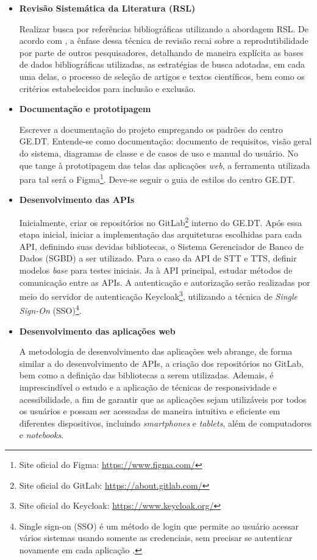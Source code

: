 \documentclass[
	12pt,				%
	a4paper,			%
	english,			%
	brazil,				%
	]{article}
\begin{document}
\begin{itemize}
	\item \textbf{Revisão Sistemática da Literatura (RSL)}
	
		Realizar busca por referências bibliográficas utilizando a abordagem RSL. De acordo com , a ênfase dessa técnica de revisão recai sobre a reprodutibilidade por parte de outros pesquisadores, detalhando de maneira explícita as bases de dados bibliográficas utilizadas, as estratégias de busca adotadas, em cada uma delas, o processo de seleção de artigos e textos científicos, bem como os critérios estabelecidos para inclusão e exclusão.
		
	\item \textbf{Documentação e prototipagem}
	
		Escrever a documentação do projeto empregando os padrões do centro GE.DT. Entende-se como documentação: documento de requisitos, visão geral do sistema, diagramas de classe e de casos de uso e manual do usuário. No que tange à prototipagem das telas das aplicações \textit{web}, a ferramenta utilizada para tal será o Figma\footnote{Site oficial do Figma: \url{https://www.figma.com/}}. Deve-se seguir o guia de estilos do centro GE.DT.
		
	
	\item \textbf{Desenvolvimento das APIs}
	
		Inicialmente, criar os repositórios no GitLab\footnote{Site oficial do GitLab: \url{https://about.gitlab.com/}} interno do GE.DT. Após essa etapa inicial, iniciar a implementação das arquiteturas escolhidas para cada API, definindo suas devidas bibliotecas, o Sistema Gerenciador de Banco de Dados (SGBD) a ser utilizado. Para o caso da API de STT e TTS, definir modelos \textit{base} para testes iniciais. Ja à API principal, estudar métodos de comunicação entre as APIs. A autenticação e autorização serão realizadas por meio do servidor de autenticação Keycloak\footnote{Site oficial do Keycloak: \url{https://www.keycloak.org/}}, utilizando a técnica de \textit{Single Sign-On} (SSO)\footnote{Single sign-on (SSO) é um método de login que permite ao usuário acessar vários sistemas usando somente as credenciais, sem precisar se autenticar novamente em cada aplicação \cite{scapicchio2024}.}. 
	
	\item \textbf{Desenvolvimento das aplicações web}
	
		A metodologia de desenvolvimento das aplicações web abrange, de forma similar a do desenvolvimento de APIs, a criação dos repositórios no GitLab, bem como a definição das bibliotecas a serem utilizadas. Ademais, é imprescindível o estudo e a aplicação de técnicas de responsividade e acessibilidade, a fim de garantir que as aplicações sejam utilizáveis por todos os usuários e possam ser acessadas de maneira intuitiva e eficiente em diferentes dispositivos, incluindo \textit{smartphones} e \textit{tablets}, além de computadores e \textit{notebooks}.
	
\end{itemize}
\end{document}
